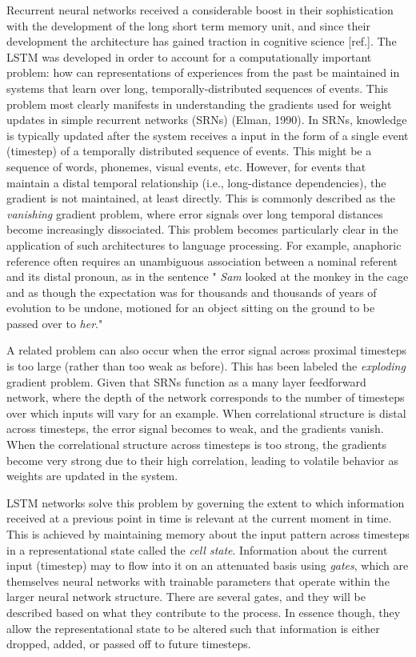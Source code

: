 \documentclass[
  american,
  man,floatsintext]{apa6}
\begin{document}
Recurrent neural networks received a considerable boost in their sophistication with the development of the long short term memory unit, and since their development the architecture has gained traction in cognitive science {[}ref.{]}. The LSTM was developed in order to account for a computationally important problem: how can representations of experiences from the past be maintained in systems that learn over long, temporally-distributed sequences of events. This problem most clearly manifests in understanding the gradients used for weight updates in simple recurrent networks (SRNs) (Elman, 1990). In SRNs, knowledge is typically updated after the system receives a input in the form of a single event (timestep) of a temporally distributed sequence of events. This might be a sequence of words, phonemes, visual events, etc. However, for events that maintain a distal temporal relationship (i.e., long-distance dependencies), the gradient is not maintained, at least directly. This is commonly described as the \emph{vanishing} gradient problem, where error signals over long temporal distances become increasingly dissociated. This problem becomes particularly clear in the application of such architectures to language processing. For example, anaphoric reference often requires an unambiguous association between a nominal referent and its distal pronoun, as in the sentence " \emph{Sam} looked at the monkey in the cage and as though the expectation was for thousands and thousands of years of evolution to be undone, motioned for an object sitting on the ground to be passed over to \emph{her}."

A related problem can also occur when the error signal across proximal timesteps is too large (rather than too weak as before). This has been labeled the \emph{exploding} gradient problem. Given that SRNs function as a many layer feedforward network, where the depth of the network corresponds to the number of timesteps over which inputs will vary for an example. When correlational structure is distal across timesteps, the error signal becomes to weak, and the gradients vanish. When the correlational structure across timesteps is too strong, the gradients become very strong due to their high correlation, leading to volatile behavior as weights are updated in the system.

LSTM networks solve this problem by governing the extent to which information received at a previous point in time is relevant at the current moment in time. This is achieved by maintaining memory about the input pattern across timesteps in a representational state called the \emph{cell state}. Information about the current input (timestep) may to flow into it on an attenuated basis using \emph{gates}, which are themselves neural networks with trainable parameters that operate within the larger neural network structure. There are several gates, and they will be described based on what they contribute to the process. In essence though, they allow the representational state to be altered such that information is either dropped, added, or passed off to future timesteps.
\end{document}
